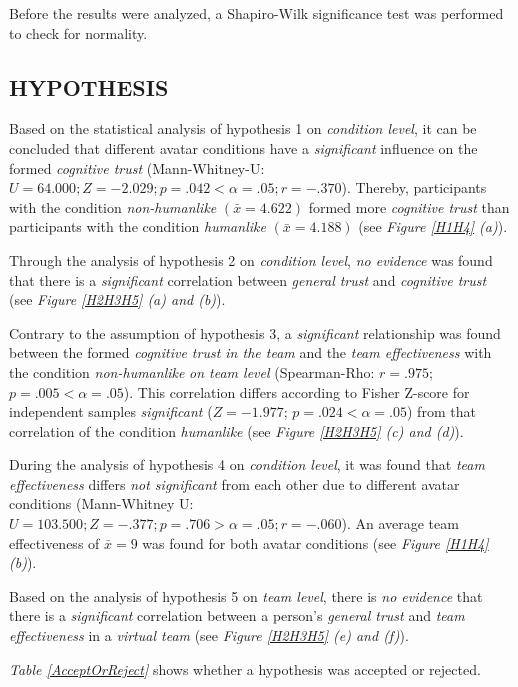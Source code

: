 \documentclass[sigchi]{acmart}
\begin{document}
Before the results were analyzed, a Shapiro-Wilk significance test was performed to check for normality.

\subsection{HYPOTHESIS}
Based on the statistical analysis of hypothesis 1 on \textit{condition level}, it can be concluded that different avatar conditions have a \textit{significant} influence on the formed \textit{cognitive trust} (Mann-Whitney-U: $U = 64.000; Z = -2.029; p =.042 < \alpha =.05; r =-.370$). Thereby, participants with the condition \textit{non-humanlike} $(\bar{x} = 4.622)$ formed more \textit{cognitive trust} than participants with the condition \textit{humanlike} $(\bar{x} = 4.188)$ (see \textit{Figure \ref{H1H4} (a)}). 

Through the analysis of hypothesis 2 on \textit{condition level}, \textit{no evidence} was found that there is a \textit{significant} correlation between \textit{general trust} and \textit{cognitive trust} (see \textit{Figure \ref{H2H3H5} (a) and (b)}). 

Contrary to the assumption of hypothesis 3, a \textit{significant} relationship was found between the formed \textit{cognitive trust in the team} and the \textit{team effectiveness} with the condition \textit{non-humanlike} \textit{on team level} (Spearman-Rho: $r =.975$; $p =.005 < \alpha = .05$). This correlation differs according to Fisher Z-score for independent samples \citep[p. 110]{cohen2013statistical} \textit{significant} ($Z=-1.977$; $p =.024 < \alpha = .05$) from that correlation of the condition \textit{humanlike} (see \textit{Figure \ref{H2H3H5} (c) and (d)}).
 
During the analysis of hypothesis 4 on \textit{condition level}, it was found that \textit{team effectiveness} differs \textit{not significant} from each other due to different avatar conditions (Mann-Whitney U: $U = 103.500; Z = -.377; p =.706 > \alpha = .05; r = -.060$). An average team effectiveness of $\bar{x} = 9$ was found for both avatar conditions (see \textit{Figure \ref{H1H4} (b)}).

Based on the analysis of hypothesis 5 on \textit{team level}, there is \textit{no evidence} that there is a \textit{significant} correlation between a person's \textit{general trust} and \textit{team effectiveness} in a \textit{virtual team} (see \textit{Figure \ref{H2H3H5} (e) and (f)}).

\textit{Table \ref{AcceptOrReject}} shows whether a hypothesis was accepted or rejected.
\end{document}

